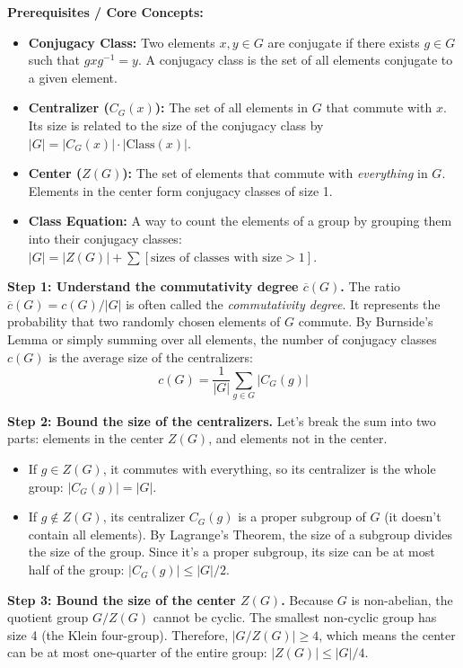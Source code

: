 \begin{solution}
\textbf{Prerequisites / Core Concepts:}
\begin{itemize}
    \item \textbf{Conjugacy Class:} Two elements $x, y \in G$ are conjugate if there exists $g \in G$ such that $g x g^{-1} = y$. A conjugacy class is the set of all elements conjugate to a given element.
    \item \textbf{Centralizer ($C_G(x)$):} The set of all elements in $G$ that commute with $x$. Its size is related to the size of the conjugacy class by $|G| = |C_G(x)| \cdot |\text{Class}(x)|$.
    \item \textbf{Center ($Z(G)$):} The set of elements that commute with \textit{everything} in $G$. Elements in the center form conjugacy classes of size 1.
    \item \textbf{Class Equation:} A way to count the elements of a group by grouping them into their conjugacy classes: $|G| = |Z(G)| + \sum [\text{sizes of classes with size} > 1]$.
\end{itemize}

\textbf{Step 1: Understand the commutativity degree $\overline{c}(G)$.}
The ratio $\overline{c}(G) = c(G)/|G|$ is often called the \textit{commutativity degree}. It represents the probability that two randomly chosen elements of $G$ commute.
By Burnside's Lemma or simply summing over all elements, the number of conjugacy classes $c(G)$ is the average size of the centralizers:
\[ c(G) = \frac{1}{|G|} \sum_{g \in G} |C_G(g)| \]

\textbf{Step 2: Bound the size of the centralizers.}
Let's break the sum into two parts: elements in the center $Z(G)$, and elements not in the center.
\begin{itemize}
    \item If $g \in Z(G)$, it commutes with everything, so its centralizer is the whole group: $|C_G(g)| = |G|$.
    \item If $g \notin Z(G)$, its centralizer $C_G(g)$ is a proper subgroup of $G$ (it doesn't contain all elements). By Lagrange's Theorem, the size of a subgroup divides the size of the group. Since it's a proper subgroup, its size can be at most half of the group: $|C_G(g)| \leq |G|/2$.
\end{itemize}

\textbf{Step 3: Bound the size of the center $Z(G)$.}
Because $G$ is non-abelian, the quotient group $G/Z(G)$ cannot be cyclic. The smallest non-cyclic group has size 4 (the Klein four-group). Therefore, $|G/Z(G)| \geq 4$, which means the center can be at most one-quarter of the entire group: $|Z(G)| \leq |G|/4$.


\end{solution}
